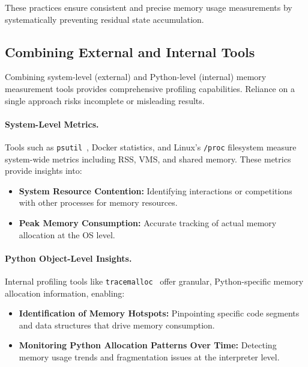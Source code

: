 These practices ensure consistent and precise memory usage measurements by systematically preventing residual state accumulation.

\subsection{Combining External and Internal Tools}
\label{subsec:mmc-bestpractices-combining-tools}

Combining system-level (external) and Python-level (internal) memory measurement tools provides comprehensive profiling capabilities.
Reliance on a single approach risks incomplete or misleading results.

\paragraph{System-Level Metrics.}
Tools such as \texttt{psutil}~\cite{psutil}, Docker statistics, and Linux's \texttt{/proc} filesystem measure system-wide metrics including \ac{RSS}, \ac{VMS}, and shared memory.
These metrics provide insights into:
\begin{itemize}

    \item \textbf{System Resource Contention:} Identifying interactions or competitions with other processes for memory resources.

    \item \textbf{Peak Memory Consumption:} Accurate tracking of actual memory allocation at the \ac{OS} level.

\end{itemize}

\paragraph{Python Object-Level Insights.}
Internal profiling tools like \texttt{tracemalloc}~\cite{tracemalloc} offer granular, Python-specific memory allocation information, enabling:
\begin{itemize}

    \item \textbf{Identification of Memory Hotspots:} Pinpointing specific code segments and data structures that drive memory consumption.

    \item \textbf{Monitoring Python Allocation Patterns Over Time:} Detecting memory usage trends and fragmentation issues at the interpreter level.

\end{itemize}

